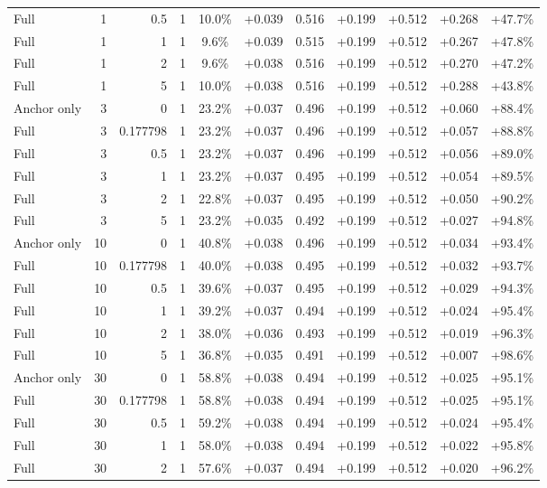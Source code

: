 \begin{table}[htbp]
\begin{tabular}{lrrrccccccc}
Full & 1 & 0.5 & 1 & 10.0\% & +0.039 & 0.516 & +0.199 & +0.512 & +0.268 & +47.7\% \\
Full & 1 & 1 & 1 & 9.6\% & +0.039 & 0.515 & +0.199 & +0.512 & +0.267 & +47.8\% \\
Full & 1 & 2 & 1 & 9.6\% & +0.038 & 0.516 & +0.199 & +0.512 & +0.270 & +47.2\% \\
Full & 1 & 5 & 1 & 10.0\% & +0.038 & 0.516 & +0.199 & +0.512 & +0.288 & +43.8\% \\
Anchor only & 3 & 0 & 1 & 23.2\% & +0.037 & 0.496 & +0.199 & +0.512 & +0.060 & +88.4\% \\
Full & 3 & 0.177798 & 1 & 23.2\% & +0.037 & 0.496 & +0.199 & +0.512 & +0.057 & +88.8\% \\
Full & 3 & 0.5 & 1 & 23.2\% & +0.037 & 0.496 & +0.199 & +0.512 & +0.056 & +89.0\% \\
Full & 3 & 1 & 1 & 23.2\% & +0.037 & 0.495 & +0.199 & +0.512 & +0.054 & +89.5\% \\
Full & 3 & 2 & 1 & 22.8\% & +0.037 & 0.495 & +0.199 & +0.512 & +0.050 & +90.2\% \\
Full & 3 & 5 & 1 & 23.2\% & +0.035 & 0.492 & +0.199 & +0.512 & +0.027 & +94.8\% \\
Anchor only & 10 & 0 & 1 & 40.8\% & +0.038 & 0.496 & +0.199 & +0.512 & +0.034 & +93.4\% \\
Full & 10 & 0.177798 & 1 & 40.0\% & +0.038 & 0.495 & +0.199 & +0.512 & +0.032 & +93.7\% \\
Full & 10 & 0.5 & 1 & 39.6\% & +0.037 & 0.495 & +0.199 & +0.512 & +0.029 & +94.3\% \\
Full & 10 & 1 & 1 & 39.2\% & +0.037 & 0.494 & +0.199 & +0.512 & +0.024 & +95.4\% \\
Full & 10 & 2 & 1 & 38.0\% & +0.036 & 0.493 & +0.199 & +0.512 & +0.019 & +96.3\% \\
Full & 10 & 5 & 1 & 36.8\% & +0.035 & 0.491 & +0.199 & +0.512 & +0.007 & +98.6\% \\
Anchor only & 30 & 0 & 1 & 58.8\% & +0.038 & 0.494 & +0.199 & +0.512 & +0.025 & +95.1\% \\
Full & 30 & 0.177798 & 1 & 58.8\% & +0.038 & 0.494 & +0.199 & +0.512 & +0.025 & +95.1\% \\
Full & 30 & 0.5 & 1 & 59.2\% & +0.038 & 0.494 & +0.199 & +0.512 & +0.024 & +95.4\% \\
Full & 30 & 1 & 1 & 58.0\% & +0.038 & 0.494 & +0.199 & +0.512 & +0.022 & +95.8\% \\
Full & 30 & 2 & 1 & 57.6\% & +0.037 & 0.494 & +0.199 & +0.512 & +0.020 & +96.2\% \\

\end{tabular}
\end{table}
